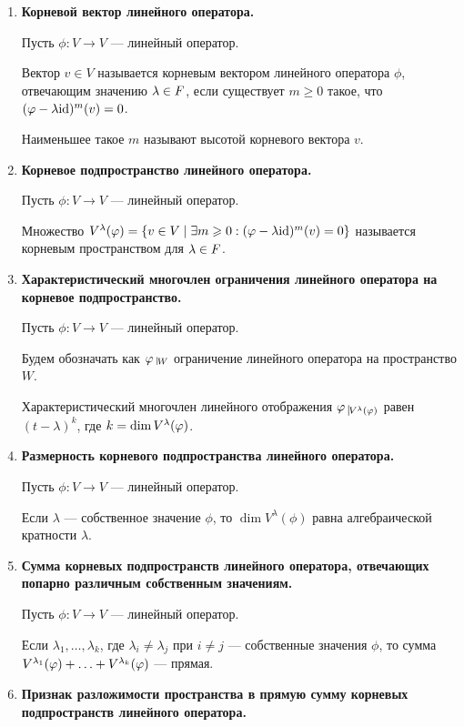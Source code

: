 \begin{enumerate}
\item \textbf{Корневой вектор линейного оператора.}

Пусть $\phi\colon V \rightarrow V$ --- линейный оператор.

Вектор $v \in V$ называется корневым вектором линейного оператора $\phi$, отвечающим значению $\lambda \in F$, если существует $m \geqslant 0$ такое, что $(\varphi - \lambda\mathrm{id})^m(v) = 0$.

Наименьшее такое $m$ называют высотой корневого вектора $v$.

\item \textbf{Корневое подпространство линейного оператора.}

Пусть $\phi\colon V \rightarrow V$ --- линейный оператор.

Множество $V^\lambda(\varphi) = \{ v \in V \mid \exists m \geqslant 0  : (\varphi - \lambda\mathrm{id})^m(v) = 0 \}$ называется корневым пространством для $\lambda \in F$.

\item \textbf{Характеристический многочлен ограничения линейного оператора на корневое подпространство.}

Пусть $\phi\colon V \rightarrow V$ --- линейный оператор.

Будем обозначать как $\phi \; \vline_{W}$ ограничение линейного оператора на пространство $W$.

Характеристический многочлен линейного отображения $\phi \; \vline_{V^{\lambda}(\phi)}$ равен $(t - \lambda)^{k}$, где $k \hm= \dim V^\l (\phi)$.

\item \textbf{Размерность корневого подпространства линейного оператора.}

Пусть $\phi\colon V \rightarrow V$ --- линейный оператор.

Если $\lambda$ --- собственное значение $\phi$, то $\dim{V^{\lambda}(\phi)}$ равна алгебраической кратности $\lambda$.

\item \textbf{Сумма корневых подпространств линейного оператора, отвечающих попарно различным собственным значениям.}

Пусть $\phi\colon V \rightarrow V$ --- линейный оператор.

Если $\lambda_1, \ldots, \lambda_k$, где $\lambda_i \neq \lambda_j$ при $i \neq j$ --- собственные значения $\phi$, то сумма $V^{\lambda_1}(\phi) + \ldots \hm+ V^{\lambda_k}(\phi)$ --- прямая.

\item \textbf{Признак разложимости пространства в прямую сумму корневых подпространств линейного оператора.}


\end{enumerate}
